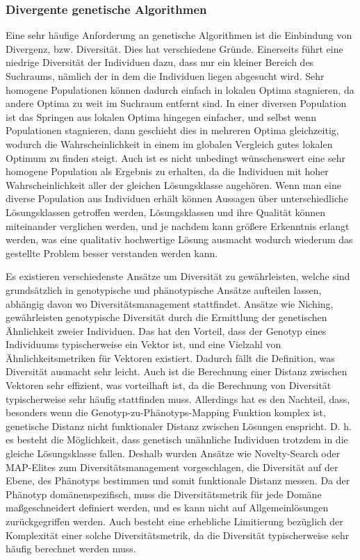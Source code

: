 \subsubsection{Divergente genetische Algorithmen}

\label{sub:divergetnGeneticAlgorithms}

Eine sehr häufige Anforderung an genetische Algorithmen ist die Einbindung von Divergenz, bzw. Diversität.
Dies hat verschiedene Gründe.
Einerseits führt eine niedrige Diversität der Individuen dazu, dass nur ein kleiner Bereich des Suchraums, nämlich der in dem die Individuen liegen abgesucht wird.
Sehr homogene Populationen können dadurch einfach in lokalen Optima stagnieren, da andere Optima zu weit im Suchraum entfernt sind.
In einer diversen Population ist das Springen aus lokalen Optima hingegen einfacher, und selbst wenn Populationen stagnieren, dann geschieht dies in mehreren Optima gleichzeitig, wodurch die Wahrscheinlichkeit in einem im globalen Vergleich gutes lokalen Optimum zu finden steigt.
Auch ist es nicht unbedingt wünschenswert eine sehr homogene Population als Ergebnis zu erhalten, da die Individuen mit hoher Wahrscheinlichkeit aller der gleichen Lösungsklasse angehören.
Wenn man eine diverse Population aus Individuen erhält können Aussagen über unterschiedliche Lösungsklassen getroffen werden, Lösungsklassen und ihre Qualität können miteinander verglichen werden, und je nachdem kann größere Erkenntnis erlangt werden, was eine qualitativ hochwertige Lösung ausmacht wodurch wiederum das gestellte Problem besser verstanden werden kann.

Es existieren verschiedenste Ansätze um Diversität zu gewährleisten, welche sind grundsätzlich in genotypische und phänotypische Ansätze aufteilen lassen, abhängig davon wo Diversitätsmanagement stattfindet.
Ansätze wie Niching\cite{Shir.2012}, gewährleisten genotypische Diversität durch die Ermittlung der genetischen Ähnlichkeit zweier Individuen.
Das hat den Vorteil, dass der Genotyp eines Individuums typischerweise ein Vektor ist, und eine Vielzahl von Ähnlichkeitsmetriken für Vektoren existiert.
Dadurch fällt die Definition, was Diversität ausmacht sehr leicht.
Auch ist die Berechnung einer Distanz zwischen Vektoren sehr effizient, was vorteilhaft ist, da die Berechnung von Diversität typischerweise sehr häufig stattfinden muss.
Allerdings hat es den Nachteil, dass, besonders wenn die Genotyp-zu-Phänotyps-Mapping Funktion komplex ist, genetische Distanz nicht funktionaler Distanz zwischen Lösungen enspricht.
D. h. es besteht die Möglichkeit, dass genetisch unähnliche Individuen trotzdem in die gleiche Lösungsklasse fallen.
Deshalb wurden Ansätze wie Novelty-Search\cite{Lehman.2011} oder MAP-Elites\cite{Mouret.4202015} zum Diversitätsmanagement vorgeschlagen, die Diversität auf der Ebene, des Phänotyps bestimmen und somit funktionale Distanz messen.
Da der Phänotyp domänenspezifisch,  muss die Diversitätsmetrik für jede Domäne maßgeschneidert definiert werden, und es kann nicht auf Allgemeinlösungen zurückgegriffen werden.
Auch besteht eine erhebliche Limitierung bezüglich der Komplexität einer solche Diversitätsmetrik, da die Diversität typischerweise sehr häufig berechnet werden muss.

